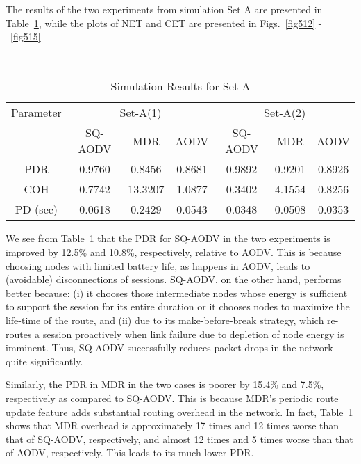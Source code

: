 The results of the two experiments from simulation Set A are presented in Table~\ref{tab56}, while the plots of NET and CET are presented in Figs.~\ref{fig512} -~\ref{fig515}

\begin{table}[htbp]
\centering
\caption{Simulation Results for Set A}
\hfill \\
\begin{tabular}{|c|c|c|c|c|c|c|}
\hline
Parameter  & \multicolumn{3}{c|}{Set-A(1)} & \multicolumn{3}{c|}{Set-A(2)} \\
\        & SQ-AODV & MDR & AODV & SQ-AODV & MDR & AODV  \\
\hline
PDR            & 0.9760   & 0.8456   & 0.8681 & 0.9892   & 0.9201   & 0.8926 \\
\hline
COH            & 0.7742   & 13.3207  & 1.0877 & 0.3402   & 4.1554   & 0.8256 \\
\hline
PD (sec)       & 0.0618   & 0.2429   & 0.0543 & 0.0348   & 0.0508   & 0.0353 \\
\hline
\end{tabular}
\label{tab56}
\end{table}

We see from Table~\ref{tab56} that the PDR for SQ-AODV in the two experiments is improved by 12.5\% and 10.8\%, respectively, relative to AODV. This is because choosing nodes with limited battery life, as happens in AODV, leads to (avoidable) disconnections of sessions. SQ-AODV, on the other hand, performs better because: (i) it chooses those intermediate nodes whose energy is sufficient to support the session for its entire duration or it chooses nodes to maximize the life-time of the route, and (ii) due to its make-before-break strategy, which re-routes a session proactively when link failure due to depletion of node energy is imminent. Thus, SQ-AODV successfully reduces packet drops in the network quite significantly.

Similarly, the PDR in MDR in the two cases is poorer by 15.4\% and 7.5\%, respectively as compared to SQ-AODV. This is because MDR's periodic route update feature adds substantial routing overhead in the network. In fact,  Table~\ref{tab56} shows that MDR overhead is approximately 17 times and 12 times worse than that of SQ-AODV, respectively, and  almost 12 times and 5 times worse than that of AODV, respectively. This leads to its much lower PDR.

